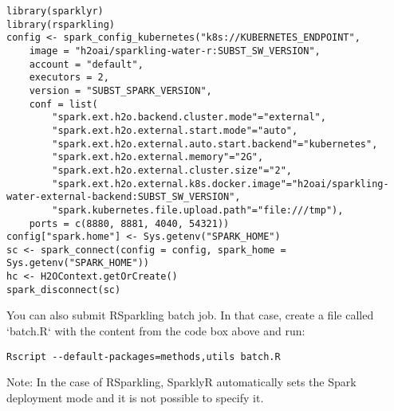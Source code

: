 \begin{lstlisting}[style=R]
library(sparklyr)
library(rsparkling)
config <- spark_config_kubernetes("k8s://KUBERNETES_ENDPOINT",
    image = "h2oai/sparkling-water-r:SUBST_SW_VERSION",
    account = "default",
    executors = 2,
    version = "SUBST_SPARK_VERSION",
    conf = list(
        "spark.ext.h2o.backend.cluster.mode"="external",
        "spark.ext.h2o.external.start.mode"="auto",
        "spark.ext.h2o.external.auto.start.backend"="kubernetes",
        "spark.ext.h2o.external.memory"="2G",
        "spark.ext.h2o.external.cluster.size"="2",
        "spark.ext.h2o.external.k8s.docker.image"="h2oai/sparkling-water-external-backend:SUBST_SW_VERSION",
        "spark.kubernetes.file.upload.path"="file:///tmp"),
    ports = c(8880, 8881, 4040, 54321))
config["spark.home"] <- Sys.getenv("SPARK_HOME")
sc <- spark_connect(config = config, spark_home = Sys.getenv("SPARK_HOME"))
hc <- H2OContext.getOrCreate()
spark_disconnect(sc)
\end{lstlisting}


You can also submit RSparkling batch job. In that case, create a file called `batch.R` with the content
from the code box above and run:

\begin{lstlisting}[style=Bash]
Rscript --default-packages=methods,utils batch.R
\end{lstlisting}

Note: In the case of RSparkling, SparklyR automatically sets the Spark deployment mode and it is not possible to specify it.
